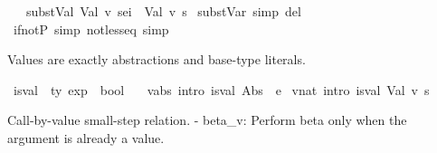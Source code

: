\begin{isabellebody}
\ \ {\isacharbar}{\kern0pt}\ subst{\isacharunderscore}{\kern0pt}Val{\isacharcolon}{\kern0pt}\ {\isachardoublequoteopen}{\isacharparenleft}{\kern0pt}Val\ v\ s{\isacharparenright}{\kern0pt}{\isacharbrackleft}{\kern0pt}e{\isacharslash}{\kern0pt}i{\isacharbrackright}{\kern0pt}\ {\isacharequal}{\kern0pt}\ Val\ v\ s{\isachardoublequoteclose}\isanewline
\isanewline
\isanewline
\isanewline
{}\isamarkupfalse%
\ subst{\isacharunderscore}{\kern0pt}Var\ {\isacharbrackleft}{\kern0pt}simp\ del{\isacharbrackright}{\kern0pt}\isanewline
\isanewline
\isanewline
\isanewline
{}\isamarkupfalse%
\ if{\isacharunderscore}{\kern0pt}not{\isacharunderscore}{\kern0pt}P\ {\isacharbrackleft}{\kern0pt}simp{\isacharbrackright}{\kern0pt}\ not{\isacharunderscore}{\kern0pt}less{\isacharunderscore}{\kern0pt}eq\ {\isacharbrackleft}{\kern0pt}simp{\isacharbrackright}{\kern0pt}\isanewline
\ \ %
%
\isadelimdocument
%
\endisadelimdocument
%
\isatagdocument
%
\isamarkuptrue%
%
\endisatagdocument
{\isafolddocument}%
%
\isadelimdocument
%
\endisadelimdocument
%
\begin{isamarkuptext}%
Values are exactly abstractions and base-type literals.%
\end{isamarkuptext}\isamarkuptrue%
\isamarkupfalse%
\ is{\isacharunderscore}{\kern0pt}val\ {\isacharcolon}{\kern0pt}{\isacharcolon}{\kern0pt}\ {\isachardoublequoteopen}{\isacharprime}{\kern0pt}ty\ exp\ {\isasymRightarrow}\ bool{\isachardoublequoteclose}\ \isanewline
\ \ v{\isacharunderscore}{\kern0pt}abs\ {\isacharbrackleft}{\kern0pt}intro{\isacharbang}{\kern0pt}{\isacharbrackright}{\kern0pt}{\isacharcolon}{\kern0pt}\ {\isachardoublequoteopen}is{\isacharunderscore}{\kern0pt}val\ {\isacharparenleft}{\kern0pt}Abs\ {\isasymtau}\ e{\isacharparenright}{\kern0pt}{\isachardoublequoteclose}\isanewline
{\isacharbar}{\kern0pt}\ v{\isacharunderscore}{\kern0pt}nat\ {\isacharbrackleft}{\kern0pt}intro{\isacharbang}{\kern0pt}{\isacharbrackright}{\kern0pt}{\isacharcolon}{\kern0pt}\ {\isachardoublequoteopen}is{\isacharunderscore}{\kern0pt}val\ {\isacharparenleft}{\kern0pt}Val\ v\ s{\isacharparenright}{\kern0pt}{\isachardoublequoteclose}%
\begin{isamarkuptext}%
Call-by-value small-step relation.
  - beta\_v: Perform beta only when the argument is already a value.

\end{isamarkuptext}
\end{isabellebody}
